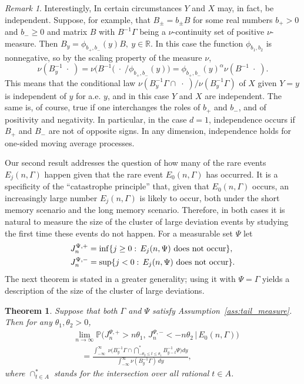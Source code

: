 \documentclass[11pt,reqno]{amsart}
\numberwithin{equation}{section}
\newtheorem{theorem}{Theorem} %
\theoremstyle{definition}
\theoremstyle{remark}
\newtheorem{remark}{Remark}[section]
\theoremstyle{definition}
\newcommand{\R}{\mathbb{R}}
\newcommand{\PP}{\mathbb{P}}
\begin{document}
\begin{remark}
Interestingly,  In certain circumstances   $Y$ and $X$ may, in fact,
be independent. 
Suppose, for example, that $B_\pm = b_\pm B$ for some 
 real numbers $b_+>0$ and $ b_-\geq 0$ and matrix $B$ with
 $B^{-1}\Gamma$ being a $\nu$-continuity set of positive
 $\nu$-measure. 
Then  $ B_y =  \phi_{b_+,b_-}(y)B, \ y\in\R$. In this case the
function $\phi_{b_1,b_2}$ is nonnegative, so by the scaling
property of the measure $\nu$,
$$
\nu( B_y^{-1} \; \cdot\; )  = \nu(
B^{-1}\bigl(\; \cdot\; /\phi_{b_+,b_-}(y)\bigr) =\phi_{b_+,b_-}(y)^\alpha 
\nu(B^{-1} \; \cdot\; ).
$$
This means that 
the conditional law $\nu (B_y^{-1} \Gamma \cap \; \cdot\; )/\nu (B_y^{-1}
  \Gamma)$ of $X$ given $Y=y$ is independent of $y$ for a.e. $y$, and 
  in this case  $Y$ and $X$ are independent. The same is, of course,
  true if one interchanges the roles of $b_+$ and $b_-$, and of
  positivity and negativity. In particular, in the case $d=1$,
  independence occurs if $B_+$ and $B_-$ are not of opposite signs. In
  any dimension, independence holds for one-sided moving average
  processes. 


\end{remark}
 

Our second result addresses the question of how many of the rare events
$E_j(n, \Gamma)$ happen given that the rare event $E_0(n, \Gamma)$ has
occurred. It is a specificity of the ``catastrophe principle'' that,
given that $E_0(n, \Gamma)$ occurs, an increasingly large number
$E_j(n, \Gamma)$  is likely to occur, both under the short memory
scenario and the long memory scenario. Therefore, in both cases it is
natural to measure the size of the cluster of large deviation events
  by studying the first time these events do not happen. For a
  measurable set $\Psi$ let 
\begin{align} \label{e:Js}
    &J_n^{\Psi,+} = \inf\{ j \geq 0 : \, E_j(n,\Psi)\ \text{does not
      occur}\},  \\
  \notag    &J_n^{\Psi,-} = \sup\{ j < 0 : \, E_j(n,\Psi)\ \text{does not
      occur}\}. 
\end{align}
The next theorem is stated in a greater generality; using it with
$\Psi=\Gamma$ yields a description of the size of the cluster of large
deviations.  



\begin{theorem}\label{thm:cluster_size}  
Suppose that both $\Gamma$ and $\Psi$ satisfy
Assumption~\ref{ass:tail_measure}. 
Then for any $\theta_1,\theta_2>0$,
\begin{equation}\label{eq:clusterSize}
\begin{aligned}
    &\lim_{n\to\infty} 
    \PP\big(J_n^{\Psi,+} > n\theta_1,\, J_n^{\Psi,-} < -n\theta_2 \,\big|\, E_0(n,\Gamma)\big) \\
    &\quad= 
    \frac{\int_{-\infty}^\infty  \;
        \nu\!\Big(B_y^{-1} \Gamma \cap \bigcap^*_{-\theta_2\le t \le \theta_1} \!\!  B_{y-t}^{-1}\Psi\Big) dy}
        {\int_{-\infty}^\infty \nu(B_y^{-1} \Gamma) \,dy},
\end{aligned}
\end{equation}
where $\cap^*_{t\in A}$ stands for the intersection over all rational
$t\in A$. 
\end{theorem}
\end{document}
